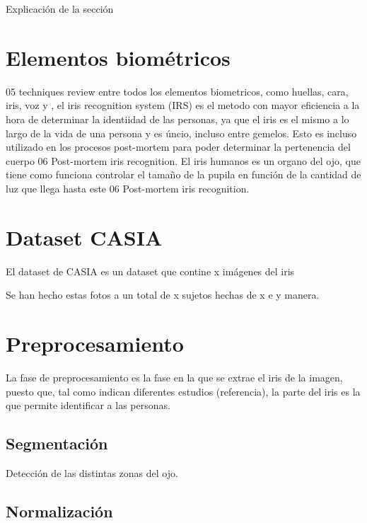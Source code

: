 
Explicación de la sección


\section{Elementos biométricos}

05 techniques review entre todos los elementos biometricos, como huellas, cara, iris, voz y , el iris recognition system (IRS) es el metodo con mayor eficiencia a la hora de determinar la identiidad
de las personas, ya que el iris es el mismo a lo largo de la vida de una persona y es úncio, incluso entre gemelos. Esto es incluso utilizado en los procesos 
post-mortem para poder determinar la pertenencia del cuerpo 06 Post-mortem iris recognition. El iris humanos es un organo del ojo, que tiene como funciona controlar el tamaño
de la pupila en función de la cantidad de luz que llega hasta este 06 Post-mortem iris recognition.

\section{Dataset CASIA}	

El dataset de CASIA es un dataset que contine x imágenes del iris

Se han hecho estas fotos a un total de x sujetos hechas de x e y manera.




\section{Preprocesamiento}

La fase de preprocesamiento es la fase en la que se extrae el iris de la imagen, puesto que, tal como indican diferentes estudios (referencia), la parte del iris es la que 
permite identificar a las personas.

\subsection{Segmentación}

Detección de las distintas zonas del ojo.

\subsection{Normalización}

